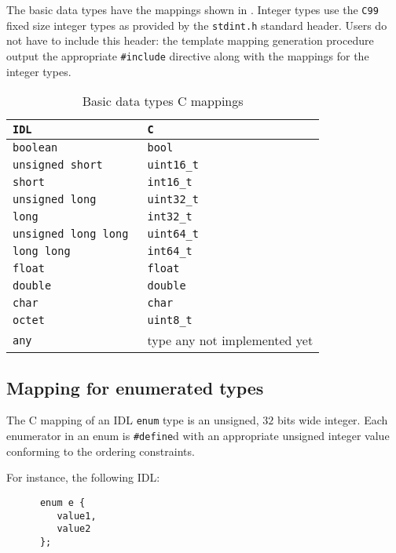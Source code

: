The     basic     data     types     have     the     mappings     shown     in
.   Integer  types
use the  {\tt C99} fixed size integer  types as provided by  the {\tt stdint.h}
standard header. Users do not have to include this header: the template mapping
generation  procedure output  the appropriate  {\tt \#include}  directive along
with the mappings for the integer types.

\begin{table}
\centering
\begin{tabular}{|ll|}
\doublehline
{\tt\bfseries IDL} & {\tt\bfseries C}\\
\hline
\tt boolean              & \tt bool\\
\tt unsigned short       & \tt uint16\_t\\
\tt short                & \tt int16\_t\\
\tt unsigned long        & \tt uint32\_t\\
\tt long                 & \tt int32\_t\\
\tt unsigned long long   & \tt uint64\_t\\
\tt long long            & \tt int64\_t\\
\tt float                & \tt float\\
\tt double               & \tt double\\
\tt char                 & \tt char\\
\tt octet                & \tt uint8\_t\\
\tt any                  & type any not implemented yet\\
\hline
\end{tabular}
\caption{Basic data types C mappings}
\label{table:mapping:cbasic}
\end{table}


\subsection{Mapping for enumerated types}

The C mapping of an IDL {\tt enum} type is an unsigned, $32$ bits wide integer.
Each  enumerator in an  enum is  {\tt \#define}d  with an  appropriate unsigned
integer  value  conforming  to  the  ordering constraints.

For instance, the following IDL:
\begin{verbatim}
      enum e {
         value1,
         value2
      };
\end{verbatim}


